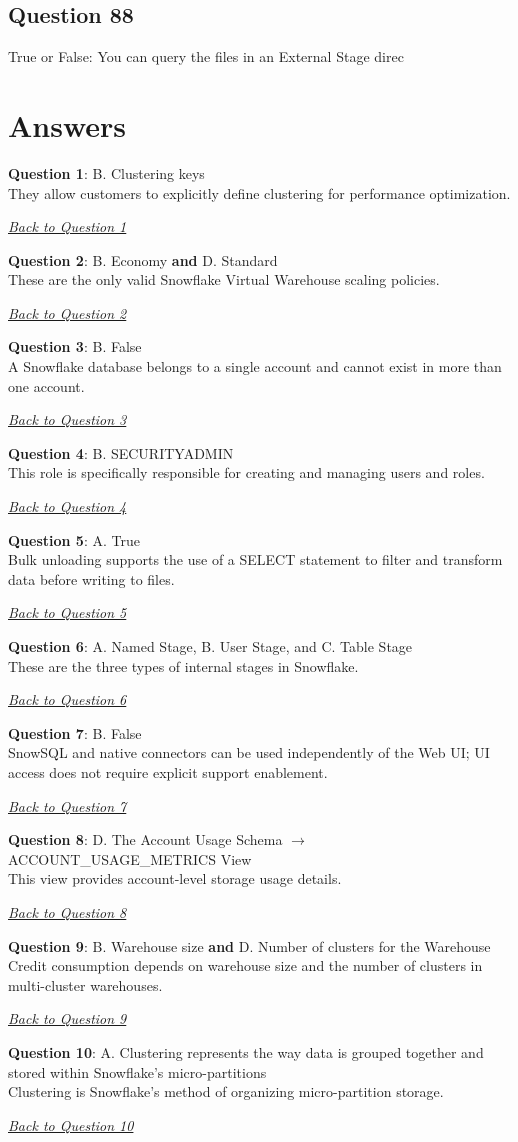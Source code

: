 \documentclass[12pt]{article}
\newcommand{\answer}[2]{%
  \textbf{Question #1}\label{ans:#1}: #2\par
  \smallskip\emph{\hyperref[q:#1]{Back to Question #1}}\par\medskip
}
\begin{document}
\subsection*{Question 88}\label{q:88}
True or False: You can query the files in an External Stage direc

\newpage
\section*{Answers}

\answer{1}{B. Clustering keys\\
They allow customers to explicitly define clustering for performance optimization.}

\answer{2}{B. Economy \textbf{and} D. Standard\\
These are the only valid Snowflake Virtual Warehouse scaling policies.}

\answer{3}{B. False\\
A Snowflake database belongs to a single account and cannot exist in more than one account.}

\answer{4}{B. SECURITYADMIN\\
This role is specifically responsible for creating and managing users and roles.}

\answer{5}{A. True\\
Bulk unloading supports the use of a SELECT statement to filter and transform data before writing to files.}

\answer{6}{A. Named Stage, B. User Stage, and C. Table Stage\\
These are the three types of internal stages in Snowflake.}

\answer{7}{B. False\\
SnowSQL and native connectors can be used independently of the Web UI; UI access does not require explicit support enablement.}

\answer{8}{D. The Account Usage Schema $\rightarrow$ ACCOUNT\_USAGE\_METRICS View\\
This view provides account-level storage usage details.}

\answer{9}{B. Warehouse size \textbf{and} D. Number of clusters for the Warehouse\\
Credit consumption depends on warehouse size and the number of clusters in multi-cluster warehouses.}

\answer{10}{A. Clustering represents the way data is grouped together and stored within Snowflake's micro-partitions\\
Clustering is Snowflake's method of organizing micro-partition storage.}
\end{document}

